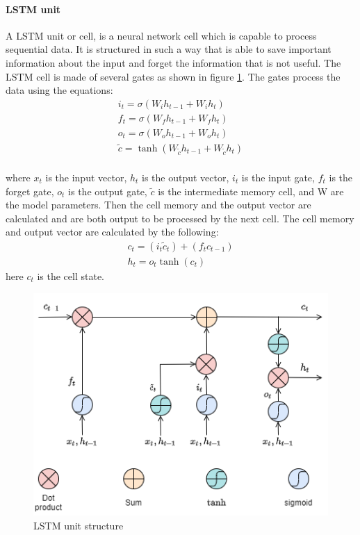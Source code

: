 \paragraph{LSTM unit}
A LSTM unit or cell, is a neural network cell which is capable to process sequential data. It is structured in such a way that is able to
save important information about the input and forget the information that is not useful. The LSTM cell is made of several gates as shown
in figure \ref{fig:lstm_unit}. The gates process the data using the equations:
\begin{equation}
    \begin{aligned}
        i_t = \sigma(W_i h_{t-1} + W_i h_t)                          \\
        f_t = \sigma(W_f h_{t-1} + W_f h_t)                          \\
        o_t = \sigma(W_o h_{t-1} + W_o h_t)                          \\
        \tilde{c} = \tanh(W_{\tilde{c}} h_{t-1} + W_{\tilde{c}} h_t) \\
    \end{aligned}
\end{equation}

where $x_t$ is the input vector, $h_t$ is the output vector, $i_t$ is the input gate, $f_t$ is the
forget gate, $o_t$ is the output gate, $\tilde{c}$ is the intermediate memory cell, and W are the model
parameters.
Then the cell memory and the output vector are calculated and are both output to be processed
by the next cell. The cell memory and output vector are calculated by the following:
\begin{equation}
    \begin{aligned}
        c_t = (i_t  \tilde{c}_t) + (f_t c_{t-1}) \\
        h_t = o_t \tanh(c_t)
    \end{aligned}
\end{equation}
here $c_t$ is the cell state.
\cite{LSTMandGRU}

\begin{figure}[ht]
    \centering
    \includegraphics[scale=0.7]{gfx/LSTM_unit}
    \captionsetup{justification=centering}
    \caption{LSTM unit structure \cite{LSTMandGRU}}
    \label{fig:lstm_unit}
\end{figure}

